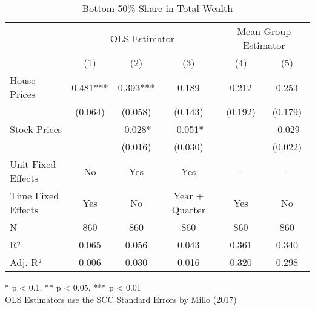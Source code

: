 \begin{table}[t]
\caption{Bottom 50\% Share in Total Wealth} 
\fontsize{12.0pt}{14.4pt}\selectfont
\begin{tabular*}{\linewidth}{@{\extracolsep{\fill}}lccccc}
\toprule
 & \multicolumn{3}{c}{OLS Estimator} & \multicolumn{2}{c}{Mean Group Estimator} \\ 
\cmidrule(lr){2-4} \cmidrule(lr){5-6}
  & (1) & (2) & (3) & (4) & (5) \\ 
\midrule\addlinespace[2.5pt]
House Prices & 0.481*** & 0.393*** & 0.189 & 0.212 & 0.253 \\ 
 & (0.064) & (0.058) & (0.143) & (0.192) & (0.179) \\ 
Stock Prices &  & -0.028* & -0.051* &  & -0.029 \\ 
{} & {} & {(0.016)} & {(0.030)} & {} & {(0.022)} \\ 
Unit Fixed Effects & No & Yes & Yes & - & - \\ 
{Time Fixed Effects} & {Yes} & {No} & {Year + Quarter} & {Yes} & {No} \\ 
N & 860 & 860 & 860 & 860 & 860 \\ 
R² & 0.065 & 0.056 & 0.043 & 0.361 & 0.340 \\ 
Adj. R² & 0.006 & 0.030 & 0.016 & 0.320 & 0.298 \\ 
\bottomrule
\end{tabular*}
\begin{minipage}{\linewidth}
* p < 0.1, ** p < 0.05, *** p < 0.01\\
OLS Estimators use the SCC Standard Errors by Millo (2017)\\
\end{minipage}
\end{table}

